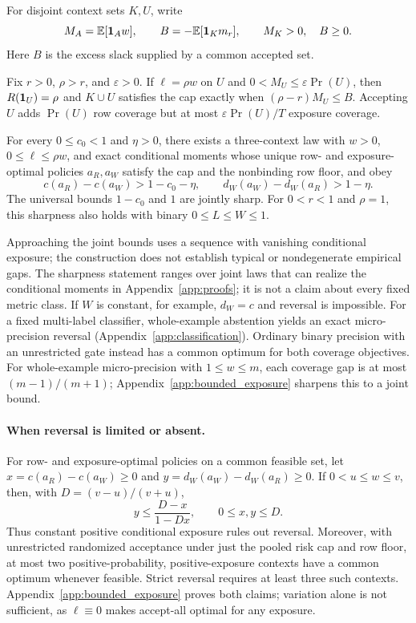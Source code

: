For disjoint context sets $K,U$, write
\[
 M_A=\mathbb{E}[\mathbf{1}_Aw],\qquad B=-\mathbb{E}[\mathbf{1}_Km_r],\qquad
 M_K>0,\quad B\geq0.
\]
Here $B$ is the excess slack supplied by a common accepted set.
\begin{proposition}
\label{prop:lowdemand}
Fix $r>0$, $\rho>r$, and $\varepsilon>0$. If $\ell=\rho w$ on $U$ and
$0<M_U\leq\varepsilon\Pr(U)$, then $R(\mathbf{1}_U)=\rho$ and
$K\cup U$ satisfies the cap exactly when $(\rho-r)M_U\leq B$.
Accepting $U$ adds $\Pr(U)$ row coverage but at most
$\varepsilon\Pr(U)/T$ exposure coverage.

For every $0\leq c_0<1$ and $\eta>0$, there exists a three-context
law with $w>0$, $0\leq\ell\leq\rho w$, and exact conditional moments
whose unique row- and exposure-optimal policies $a_R,a_W$ satisfy
the cap and the nonbinding row floor, and obey
\[
 c(a_R)-c(a_W)>1-c_0-\eta,\qquad
 d_W(a_W)-d_W(a_R)>1-\eta.
\]
The universal bounds $1-c_0$ and $1$ are jointly sharp. For
$0<r<1$ and $\rho=1$, this sharpness also holds with binary $0\leq L\leq W\leq1$.
\end{proposition}
Approaching the joint bounds uses a sequence with vanishing conditional exposure; the construction does not establish typical or nondegenerate empirical gaps. The sharpness statement ranges over joint laws that can realize the
conditional moments in Appendix~\ref{app:proofs}; it is not a claim
about every fixed metric class. If $W$ is constant, for example,
$d_W=c$ and reversal is impossible. For a fixed multi-label classifier, whole-example abstention yields an exact micro-precision reversal (Appendix~\ref{app:classification}). Ordinary binary precision with an unrestricted gate instead has a common optimum for both coverage objectives. For whole-example micro-precision with $1\leq w\leq m$, each coverage gap is at most $(m-1)/(m+1)$; Appendix~\ref{app:bounded_exposure} sharpens this to a joint bound.

\paragraph{When reversal is limited or absent.}
For row- and exposure-optimal policies on a common feasible set, let
$x=c(a_R)-c(a_W)\geq0$ and $y=d_W(a_W)-d_W(a_R)\geq0$.
If $0<u\leq w\leq v$, then, with $D=(v-u)/(v+u)$,
\begin{equation}
 y\leq\frac{D-x}{1-Dx},\qquad 0\leq x,y\leq D.
 \label{eq:bounded}
\end{equation}
Thus constant positive conditional exposure rules out reversal. Moreover,
with unrestricted randomized acceptance under just the pooled risk cap and row
floor, at most two positive-probability, positive-exposure contexts have a common
optimum whenever feasible. Strict reversal requires at least three such contexts.
Appendix~\ref{app:bounded_exposure} proves both claims; variation alone is not
sufficient, as $\ell\equiv0$ makes accept-all optimal for any exposure.

